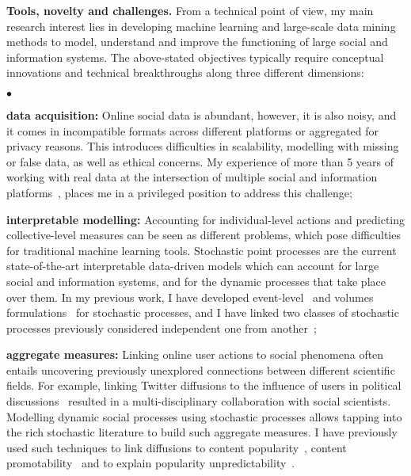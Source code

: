 \documentclass[12pt]{article}
\newcommand{\secmoveup}{\vspace{-2.5mm}} %
\newcommand{\squishlist}{
 \begin{list}{$\bullet$}
  { \setlength{\itemsep}{0pt}
     \setlength{\parsep}{3pt}
     \setlength{\topsep}{3pt}
     \setlength{\partopsep}{0pt}
     \setlength{\leftmargin}{1.5em}
     \setlength{\labelwidth}{1em}
     \setlength{\labelsep}{0.5em} } }
\newcommand{\squishend}{
  \end{list}  }
\begin{document}
\textbf{Tools, novelty and challenges.}
From a technical point of view, my main research interest lies in developing machine learning and large-scale data mining methods to model, understand and improve the functioning of large social and information systems.
The above-stated objectives typically require conceptual innovations and technical breakthroughs along three different dimensions:
\vspace{-.3cm}
\squishlist
	\item \textbf{data acquisition:} 
	Online social data is abundant, however, it is also noisy, and it comes in incompatible formats across different platforms or aggregated for privacy reasons.
	This introduces difficulties in scalability, modelling with missing or false data, as well as ethical concerns.
	My experience of more than 5 years of working with real data at the intersection of multiple social and information platforms~\cite{Mishra2016,Rizoiu2018a,Rizoiu2018,Rizoiu2017b,Rizoiu2016,Rizoiu2017}, places me in a privileged position to address this challenge;
	
	\item \textbf{interpretable modelling:}
	Accounting for individual-level actions and predicting collective-level measures can be seen as different problems, which pose difficulties for traditional machine learning tools.
	Stochastic point processes are the current state-of-the-art interpretable data-driven models which can account for large social and information systems, and for the dynamic processes that take place over them.
	In my previous work, I have developed event-level~\cite{Mishra2016} and volumes formulations~\cite{Rizoiu2017} for stochastic processes, and I have linked two classes of stochastic processes previously considered independent  one from another~\cite{Rizoiu2018};
	
	\item \textbf{aggregate measures:} 
	Linking online user actions to social phenomena	often entails uncovering previously unexplored connections between different scientific fields.
	For example, linking Twitter diffusions to the influence of users in political discussions~\cite{Rizoiu2018a} resulted in a multi-disciplinary collaboration with social scientists.
	Modelling dynamic social processes using stochastic processes allows tapping into the rich stochastic literature to build such aggregate measures.
	I have previously used such techniques to link diffusions to content popularity~\cite{Rizoiu2017}, content promotability~\cite{Rizoiu2017b} and to explain popularity unpredictability~\cite{Rizoiu2018a}.
\squishend


\secmoveup
\secmoveup
{ \small
	
	
}
\end{document}
